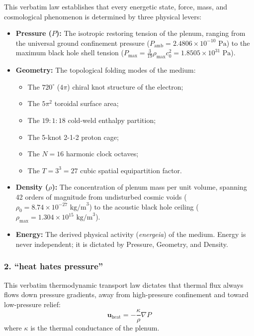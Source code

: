 \documentclass[11pt,a4paper]{article}
\begin{document}
This verbatim law establishes that every energetic state, force, mass, and cosmological phenomenon is determined by three physical levers:
\begin{itemize}
    \item \textbf{Pressure ($P$):} The isotropic restoring tension of the plenum, ranging from the universal ground confinement pressure ($P_{\text{amb}} = 2.4806 \times 10^{-10}\text{ Pa}$) to the maximum black hole shell tension ($P_{\max} = \frac{3}{19}\rho_{\max}c_0^2 = 1.8505 \times 10^{31}\text{ Pa}$).
    \item \textbf{Geometry:} The topological folding modes of the medium:
    \begin{itemize}
        \item The $720^\circ$ ($4\pi$) chiral knot structure of the electron;
        \item The $5\pi^2$ toroidal surface area;
        \item The $19:1:18$ cold-weld enthalpy partition;
        \item The 5-knot 2-1-2 proton cage;
        \item The $N = 16$ harmonic clock octaves;
        \item The $T = 3^3 = 27$ cubic spatial equipartition factor.
    \end{itemize}
    \item \textbf{Density ($\rho$):} The concentration of plenum mass per unit volume, spanning 42 orders of magnitude from undisturbed cosmic voids ($\rho_0 = 8.74 \times 10^{-27}\text{ kg/m}^3$) to the acoustic black hole ceiling ($\rho_{\max} = 1.304 \times 10^{15}\text{ kg/m}^3$).
    \item \textbf{Energy:} The derived physical activity (\textit{energeia}) of the medium. Energy is never independent; it is dictated by Pressure, Geometry, and Density.
\end{itemize}

\subsubsection{2. ``heat hates pressure''}

This verbatim thermodynamic transport law dictates that thermal flux always flows down pressure gradients, away from high-pressure confinement and toward low-pressure relief:
\begin{equation}
\mathbf{u}_{\text{heat}} = -\frac{\kappa}{\rho} \nabla P
\label{eq:heat_hates_pressure_law}
\end{equation}
where $\kappa$ is the thermal conductance of the plenum.
\end{document}
